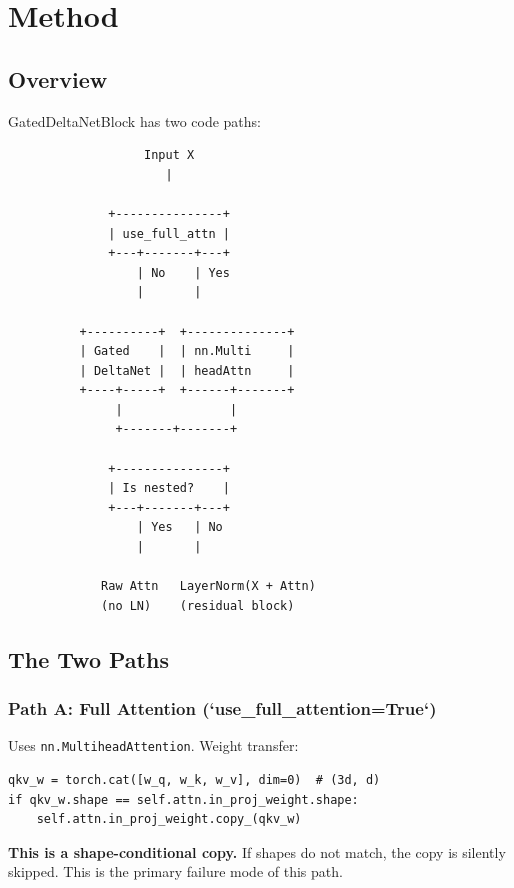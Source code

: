 
\section{Method}

\subsection{Overview}

GatedDeltaNetBlock has two code paths:

\begin{lstlisting}
                   Input X
                      |
                       
              +---------------+
              | use_full_attn |
              +---+-------+---+
                  | No    | Yes
                  |       |
                           
          +----------+  +--------------+
          | Gated    |  | nn.Multi     |
          | DeltaNet |  | headAttn     |
          +----+-----+  +------+-------+
               |               |
               +-------+-------+
                        
              +---------------+
              | Is nested?    |
              +---+-------+---+
                  | Yes   | No
                  |       |
                           
             Raw Attn   LayerNorm(X + Attn)
             (no LN)    (residual block)
\end{lstlisting}

\subsection{The Two Paths}

\subsubsection{Path A: Full Attention (`use\_full\_attention=True`)}

Uses \texttt{nn.MultiheadAttention}. Weight transfer:

\begin{lstlisting}
qkv_w = torch.cat([w_q, w_k, w_v], dim=0)  # (3d, d)
if qkv_w.shape == self.attn.in_proj_weight.shape:
    self.attn.in_proj_weight.copy_(qkv_w)
\end{lstlisting}

\textbf{This is a shape-conditional copy.} If shapes do not match, the copy is 
silently skipped. This is the primary failure mode of this path.

